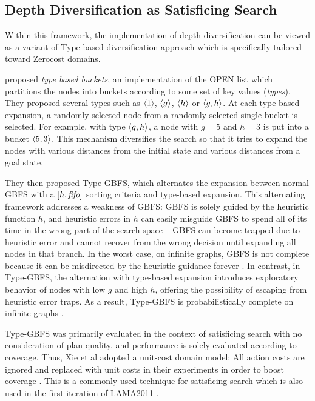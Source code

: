 \subsection{Depth Diversification as Satisficing Search}
\label{sec:depth-vs-types}
Within this framework, the implementation of depth diversification can be viewed as a variant of Type-based diversification approach \cite{xie14type} which is specifically tailored toward Zerocost domains.

\citeauthor{xie14type} proposed \emph{type based buckets}, an implementation of the OPEN list which partitions the nodes into buckets according to some set of key values (\emph{types}). They proposed several types such as ${\left<1\right>}$, ${\left<g\right>}$, ${\left<h\right>}$ or ${\left<g,h\right>}$. At each type-based expansion, a randomly selected node from a randomly selected single bucket is selected. For example, with type ${\left<g,h\right>}$, a node with $g=5$ and $h=3$ is put into a bucket  ${\left<5,3\right>}$. This mechanism diversifies the search so that it tries to expand the nodes with various distances from the initial state and various distances from a goal state.

They then proposed Type-GBFS, which alternates the expansion between normal GBFS with a $[h,{\text{\textit{fifo}}}]$ sorting criteria and type-based expansion. This alternating framework addresses a weakness of GBFS: 
GBFS is solely guided by the heuristic function $h$, and heuristic errors in $h$ can easily misguide GBFS to spend all of its time in the wrong part of the search space -- GBFS can become trapped due to heuristic error and cannot recover from the wrong decision until expanding all nodes in that branch.
In the worst case, on infinite graphs, GBFS is not complete because it can be misdirected by the heuristic guidance forever \cite{Valenzano2016}.
In contrast, in Type-GBFS, the alternation with type-based expansion introduces exploratory behavior of nodes with low $g$ and high $h$, offering the possibility of escaping from heuristic error traps.
As a result, Type-GBFS is probabilistically complete on infinite graphs \cite{Valenzano2016}.

Type-GBFS was primarily evaluated in the context of satisficing search with no consideration of plan quality, and performance is solely evaluated according to coverage.
Thus, Xie et al adopted a unit-cost domain model: All action costs are ignored and replaced with unit costs in their experiments in order to boost coverage \cite{xie14type}. This is a commonly used technique for satisficing search which is also used in the first iteration of LAMA2011 \cite{richter2011lama}. 

